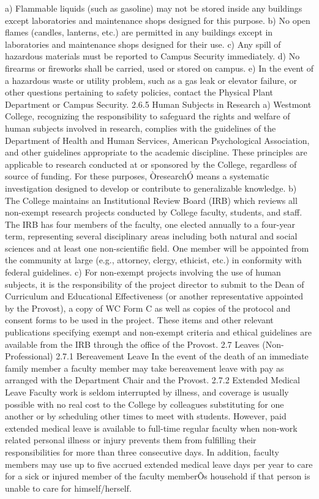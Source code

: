 \documentclass[letterpaper, 11pt]{article}
\begin{document}
a) Flammable liquids (such as gasoline) may not be stored inside any buildings except laboratories and maintenance shops designed for this purpose.
b) No open flames (candles, lanterns, etc.) are permitted in any buildings except in laboratories and maintenance shops designed for their use.
c) Any spill of hazardous materials must be reported to Campus Security immediately.
d) No firearms or fireworks shall be carried, used or stored on campus.
e) In the event of a hazardous waste or utility problem, such as a gas leak or elevator failure, or other questions pertaining to safety policies, contact the Physical Plant Department or Campus Security.
2.6.5 Human Subjects in Research
a) Westmont College, recognizing the responsibility to safeguard the rights and welfare of human subjects involved in research, complies with the guidelines of the Department of Health and Human Services, American Psychological Association, and other guidelines appropriate to the academic discipline.  These principles are applicable to research conducted at or sponsored by the College, regardless of source of funding.  For these purposes, ÒresearchÓ means a systematic investigation designed to develop or contribute to generalizable knowledge.
b) The College maintains an Institutional Review Board (IRB) which reviews all non-exempt research projects conducted by College faculty, students, and staff.  The IRB has four members of the faculty, one elected annually to a four-year term, representing several disciplinary areas including both natural and social sciences and at least one non-scientific field.  One member will be appointed from the community at large (e.g., attorney, clergy, ethicist, etc.) in conformity with federal guidelines.
c) For non-exempt projects involving the use of human subjects, it is the responsibility of the project director to submit to the Dean of Curriculum and Educational Effectiveness (or another representative appointed by the Provost), a copy of WC Form C as well as copies of the protocol and consent forms to be used in the project.  These items and other relevant publications specifying exempt and non-exempt criteria and ethical guidelines are available from the IRB through the office of the Provost.
2.7 Leaves (Non-Professional)
2.7.1 Bereavement Leave
   In the event of the death of an immediate family member a faculty member may take bereavement leave with pay as arranged with the Department Chair and the Provost.
2.7.2 Extended Medical Leave
   Faculty work is seldom interrupted by illness, and coverage is usually possible with no real cost to the College by colleagues substituting for one another or by scheduling other times to meet with students.  However, paid extended medical leave is available to full-time regular faculty when non-work related personal illness or injury prevents them from fulfilling their responsibilities for more than three consecutive days.  In addition, faculty members may use up to five accrued extended medical leave days per year to care for a sick or injured member of the faculty memberÕs household if that person is unable to care for himself/herself.
\end{document}
